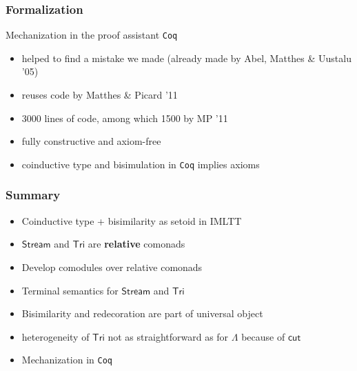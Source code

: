 \documentclass[
]
{beamer}
\newcommand{\constfont}[1]{\ensuremath{\mathsf{#1}}}
\newcommand{\Tri}{\constfont{Tri}}
\newcommand{\stream}{\constfont{Stream}}
\newcommand{\redec}{\constfont{redec}}
\newcommand{\cut}{\constfont{cut}}
\newcommand{\Setoid}{\constfont{Setoid}}
\newcommand{\LC}{{\Lambda}}
\newcommand{\fat}[1]{\textbf{#1}}
\begin{document}

\begin{comment}
\begin{frame}
 \frametitle{Closing remarks}
 
   \begin{block}{Higher order compatibility}
    Observing that $\Setoid$ is cartesian closed, one can encode
       \[ f \sim g  \Longrightarrow \redec~f \sim \redec~g\]
    in definition of coalgebra for signature of $\Tri$
   \end{block}
\end{frame}
\end{comment}
 
\begin{frame}
  \frametitle{Formalization}
   \begin{block}{Mechanization in the proof assistant \texttt{Coq}}
      \begin{itemize}\setlength{\itemsep}{1em}
       \item helped to find a mistake we made (already made by Abel, Matthes \& Uustalu '05)
       \item reuses code by Matthes \& Picard '11
       \item 3000 lines of code, among which 1500 by MP '11
       \item fully constructive and axiom-free
       \item coinductive type and bisimulation in \texttt{Coq} implies axioms
      \end{itemize}
   \end{block}
   
\end{frame}

\begin{frame}
 \frametitle{Summary}
  
   \begin{itemize}\setlength{\itemsep}{1em}
    \item Coinductive type + bisimilarity as setoid in IMLTT
    \item $\stream$ and $\Tri$ are \fat{relative} comonads
    \item Develop comodules over relative comonads
    \item Terminal semantics for $\stream$ and $\Tri$
    \item Bisimilarity and redecoration are part of universal object
    \item heterogeneity of $\Tri$ not as straightforward as for $\LC$ because of $\cut$
    \item Mechanization in \texttt{Coq}
   \end{itemize}

   
\end{frame}
\end{document}
